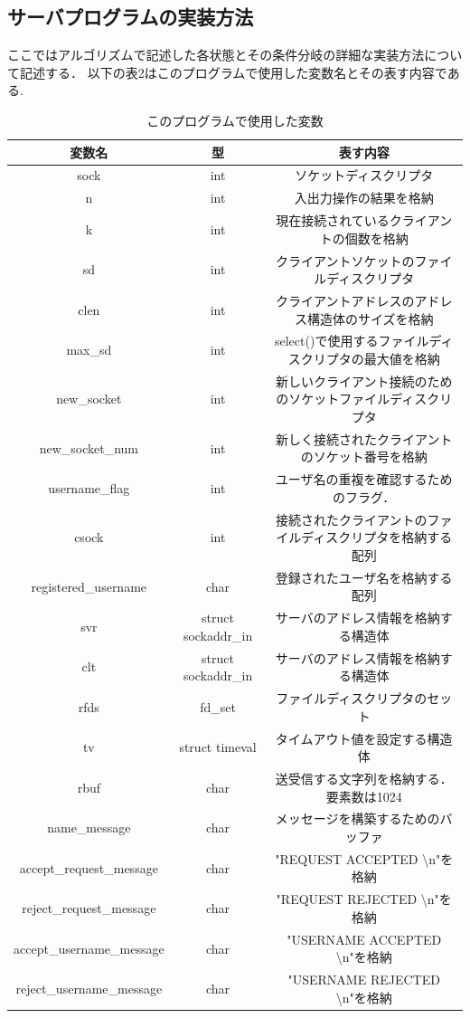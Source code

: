 \documentclass[dvipdfmx]{jarticle}
\begin{document}
\subsection{サーバプログラムの実装方法}
ここではアルゴリズムで記述した各状態とその条件分岐の詳細な実装方法について記述する．
以下の表2はこのプログラムで使用した変数名とその表す内容である.
\begin{table}[h]
    \centering
    \begin{tabular}{|c|c|c|}
        \hline
        変数名 & 型 & 表す内容\\\hline\hline
        sock & int & ソケットディスクリプタ\\\hline
        n & int & 入出力操作の結果を格納\\\hline
        k & int & 現在接続されているクライアントの個数を格納\\\hline
        sd & int & クライアントソケットのファイルディスクリプタ\\\hline
        clen & int & クライアントアドレスのアドレス構造体のサイズを格納\\\hline
        max\_sd & int & select()で使用するファイルディスクリプタの最大値を格納\\\hline
        new\_socket & int & 新しいクライアント接続のためのソケットファイルディスクリプタ\\\hline
        new\_socket\_num & int & 新しく接続されたクライアントのソケット番号を格納\\\hline
        username\_flag & int & ユーザ名の重複を確認するためのフラグ．\\\hline
        csock & int & 接続されたクライアントのファイルディスクリプタを格納する配列\\\hline
        registered\_username & char & 登録されたユーザ名を格納する配列\\\hline
        svr & struct sockaddr\_in & サーバのアドレス情報を格納する構造体\\\hline
        clt & struct sockaddr\_in & サーバのアドレス情報を格納する構造体\\\hline
        rfds & fd\_set & ファイルディスクリプタのセット\\\hline
        tv & struct timeval & タイムアウト値を設定する構造体\\\hline
        rbuf & char & 送受信する文字列を格納する．要素数は1024\\\hline
        name\_message & char & メッセージを構築するためのバッファ\\\hline
        accept\_request\_message & char & "REQUEST ACCEPTED \textbackslash n"を格納\\\hline
        reject\_request\_message & char & "REQUEST REJECTED \textbackslash n"を格納\\\hline
        accept\_username\_message & char & "USERNAME ACCEPTED \textbackslash n"を格納\\\hline
        reject\_username\_message & char & "USERNAME REJECTED \textbackslash n"を格納\\\hline
    \end{tabular}
    \caption{このプログラムで使用した変数}
\end{table}
\end{document}
